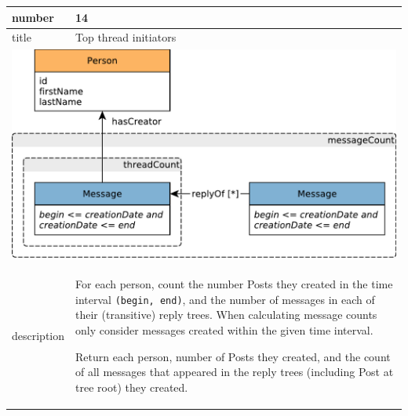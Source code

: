 \renewcommand*{\arraystretch}{1.5}
\noindent\begin{tabularx}{17cm}{|p{1.95cm}|X|}
	\hline
	number      & 14                                                          \\ \hline
	title       & Top thread initiators                                                           \\ \hline
	\multicolumn{2}{|c|}{ \includegraphics[scale=\patternscale,margin=0cm .2cm]{patterns/q14}} \\ \hline
	description & For each person, count the number Posts they created in the time
interval \texttt{(begin,\ end)}, and the number of messages in each of
their (transitive) reply trees. When calculating message counts only
consider messages created within the given time interval.

Return each person, number of Posts they created, and the count of all
messages that appeared in the reply trees (including Post at tree root)
they created.
 \\ \hline
	

\end{tabularx}
